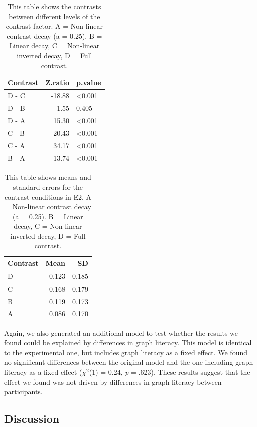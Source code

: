\documentclass[preprint, 3p,
authoryear]{elsarticle} %
\begin{document}
\begin{table}

\caption{\label{tab:contrasts-table-e2}\label{contrasts-table-e2}This table shows the contrasts between different levels of the contrast factor. A = Non-linear contrast decay (a = 0.25). B = Linear decay, C = Non-linear inverted decay, D = Full contrast.}
\centering
\begin{tabular}[t]{lrl}
\toprule
Contrast & Z.ratio & p.value\\
\midrule
D - C & -18.88 & <0.001\\
D - B & 1.55 & 0.405\\
D - A & 15.30 & <0.001\\
C - B & 20.43 & <0.001\\
C - A & 34.17 & <0.001\\
\addlinespace
B - A & 13.74 & <0.001\\
\bottomrule
\end{tabular}
\end{table}

\begin{table}

\caption{\label{tab:sum-stats-e2}\label{sum-stats-e2}This table shows means and standard errors for the contrast conditions in E2. A = Non-linear contrast decay (a = 0.25). B = Linear decay, C = Non-linear inverted decay, D = Full contrast.}
\centering
\begin{tabular}[t]{lrr}
\toprule
Contrast & Mean & SD\\
\midrule
D & 0.123 & 0.185\\
C & 0.168 & 0.179\\
B & 0.119 & 0.173\\
A & 0.086 & 0.170\\
\bottomrule
\end{tabular}
\end{table}

Again, we also generated an additional model to test whether the results
we found could be explained by differences in graph literacy. This model
is identical to the experimental one, but includes graph literacy as a
fixed effect. We found no significant differences between the original
model and the one including graph literacy as a fixed effect
(\(\chi^2\)(1) = 0.24, \emph{p} = .623). These results suggest that the
effect we found was not driven by differences in graph literacy between
participants.

\hypertarget{discussion-1}{%
\subsection{Discussion}\label{discussion-1}}
\end{document}
